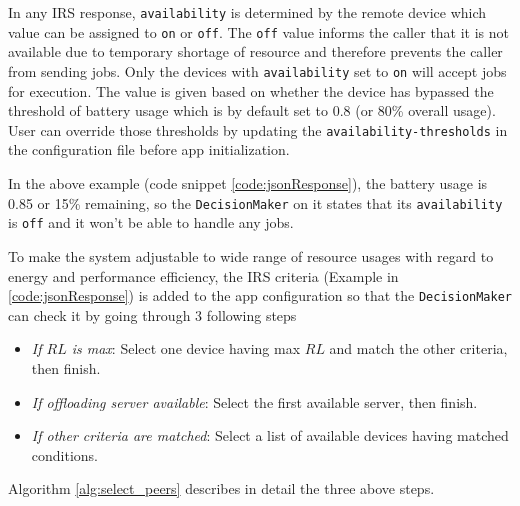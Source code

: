 \documentclass{sig-alternate}[10pt]
\begin{document}
In any IRS response, \texttt{availability} is determined by the remote device which value can be assigned to \texttt{on} or \texttt{off}. The \texttt{off} value informs the caller that it is not available due to temporary shortage of resource and therefore prevents the caller from sending jobs. Only the devices with \texttt{availability} set to \texttt{on} will accept jobs for execution. The value is given based on whether the device has bypassed the threshold of battery usage which is by default set to 0.8 (or 80\% overall usage). User can override those thresholds by updating the \texttt{availability-thresholds} in the configuration file before app initialization. 

In the above example (code snippet \ref{code:jsonResponse}), the battery usage is 0.85 or 15\% remaining, so the \texttt{DecisionMaker} on it states that its \texttt{availability} is \texttt{off} and it won't be able to handle any jobs.

To make the system adjustable to wide range of resource usages with regard to energy and performance efficiency, the IRS criteria (Example in \ref{code:jsonResponse}) is added to the app configuration so that the \texttt{DecisionMaker} can check it by going through 3 following steps
\begin{itemize}
	\item \emph{If $RL$ is max}: Select one device having max $RL$ and match the other criteria, then finish.
	\item \emph{If offloading server available}: Select the first available server, then finish.
	\item \emph{If other criteria are matched}: Select a list of available devices having matched conditions.
\end{itemize}
Algorithm \ref{alg:select_peers} describes in detail the three above steps.
\end{document}
